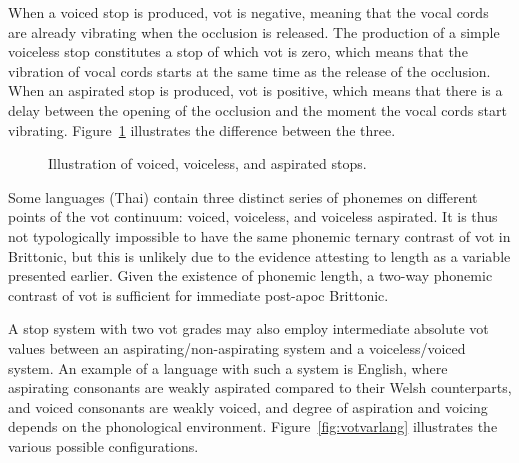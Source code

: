 When a voiced stop is produced, \gls{vot} is negative, meaning that the vocal cords are already vibrating when the occlusion is released. The production of a simple voiceless stop constitutes a stop of which \gls{vot} is  zero, which means that the vibration of vocal cords starts at the same time as the release of the occlusion. When an aspirated stop is produced, \gls{vot} is positive, which means that there is a delay between the opening of the occlusion and the moment the vocal cords start vibrating. Figure~\ref{fig:vvadiagram} illustrates the difference between the three.

\begin{figure}[h]
  \centering
  \caption{Illustration of voiced, voiceless, and aspirated stops.}
  \label{fig:vvadiagram}
\end{figure}
Some languages (\eg Thai) contain three distinct series of \gls{phoneme}s on different points of the \gls{vot} continuum: voiced, voiceless, and voiceless aspirated. It is thus not typologically impossible to have the same phonemic ternary contrast of \gls{vot} in Brittonic, but this is unlikely due to the evidence attesting to length as a variable presented earlier. Given the existence of phonemic length, a two-way phonemic contrast of \gls{vot} is sufficient for immediate post-\gls{apoc} Brittonic.



A stop system with two \gls{vot} grades may also employ intermediate absolute \gls{vot} values between an aspirating/non-aspirating system and a voiceless/voiced system. An example of a language with such a system is English, where aspirating consonants are weakly aspirated compared to their Welsh counterparts, and voiced consonants are weakly voiced, and degree of aspiration and voicing depends on the phonological environment. Figure~\ref{fig:votvarlang} illustrates the various possible configurations. 

